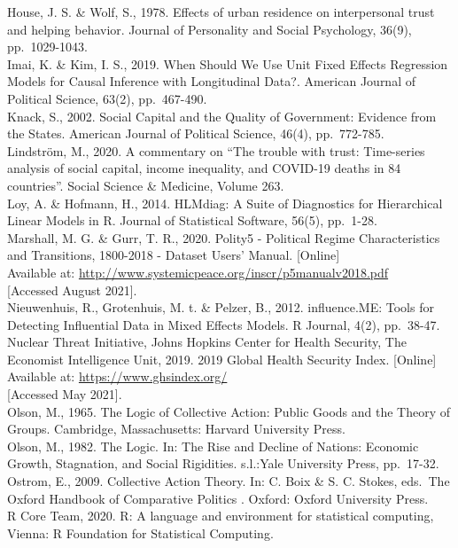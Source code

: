 \documentclass[
  11pt,
]{article}
\begin{document}
House, J. S. \& Wolf, S., 1978. Effects of urban residence on interpersonal trust and helping behavior. Journal of Personality and Social Psychology, 36(9), pp.~1029-1043.\\
Imai, K. \& Kim, I. S., 2019. When Should We Use Unit Fixed Effects Regression Models for Causal Inference with Longitudinal Data?. American Journal of Political Science, 63(2), pp.~467-490.\\
Knack, S., 2002. Social Capital and the Quality of Government: Evidence from the States. American Journal of Political Science, 46(4), pp.~772-785.\\
Lindström, M., 2020. A commentary on ``The trouble with trust: Time-series analysis of social capital, income inequality, and COVID-19 deaths in 84 countries''. Social Science \& Medicine, Volume 263.\\
Loy, A. \& Hofmann, H., 2014. HLMdiag: A Suite of Diagnostics for Hierarchical Linear Models in R. Journal of Statistical Software, 56(5), pp.~1-28.\\
Marshall, M. G. \& Gurr, T. R., 2020. Polity5 - Political Regime Characteristics and Transitions, 1800-2018 - Dataset Users' Manual. {[}Online{]}\\
Available at: \url{http://www.systemicpeace.org/inscr/p5manualv2018.pdf}\\
{[}Accessed August 2021{]}.\\
Nieuwenhuis, R., Grotenhuis, M. t. \& Pelzer, B., 2012. influence.ME: Tools for Detecting Influential Data in Mixed Effects Models. R Journal, 4(2), pp.~38-47.\\
Nuclear Threat Initiative, Johns Hopkins Center for Health Security, The Economist Intelligence Unit, 2019. 2019 Global Health Security Index. {[}Online{]}\\
Available at: \url{https://www.ghsindex.org/}\\
{[}Accessed May 2021{]}.\\
Olson, M., 1965. The Logic of Collective Action: Public Goods and the Theory of Groups. Cambridge, Massachusetts: Harvard University Press.\\
Olson, M., 1982. The Logic. In: The Rise and Decline of Nations: Economic Growth, Stagnation, and Social Rigidities. s.l.:Yale University Press, pp.~17-32.\\
Ostrom, E., 2009. Collective Action Theory. In: C. Boix \& S. C. Stokes, eds.~The Oxford Handbook of Comparative Politics . Oxford: Oxford University Press.\\
R Core Team, 2020. R: A language and environment for statistical computing, Vienna: R Foundation for Statistical Computing.\\
\end{document}
